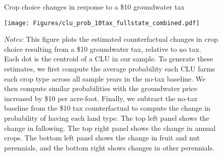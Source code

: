 \begin{figure}[t]
\begin{centering}
\caption{Crop choice changes in response to a \$10 groundwater tax}
\label{fig:cf_water_tax}
\texttt{[image: Figures/clu\_prob\_10tax\_fullstate\_combined.pdf]}
\caption*{\scriptsize \emph{Notes:} This figure plots the estimated counterfactual changes in crop choice resulting from a \$10 groundwater tax, relative to no tax. Each dot is the centroid of a CLU in our sample. To generate these estimates, we first compute the average probability each CLU farms each crop type across all sample years in the no-tax baseline. We then compute similar probabilities with the groundwater price increased by \$10 per acre-foot. Finally, we subtract the no-tax baseline from the \$10 tax counterfactual to compute the change in probability of having each land type. The top left panel shows the change in fallowing. The top right panel shows the change in annual crops. The bottom left panel shows the change in fruit and nut perennials, and the bottom right shows changes in other perennials.
}
\end{centering}
\end{figure}

